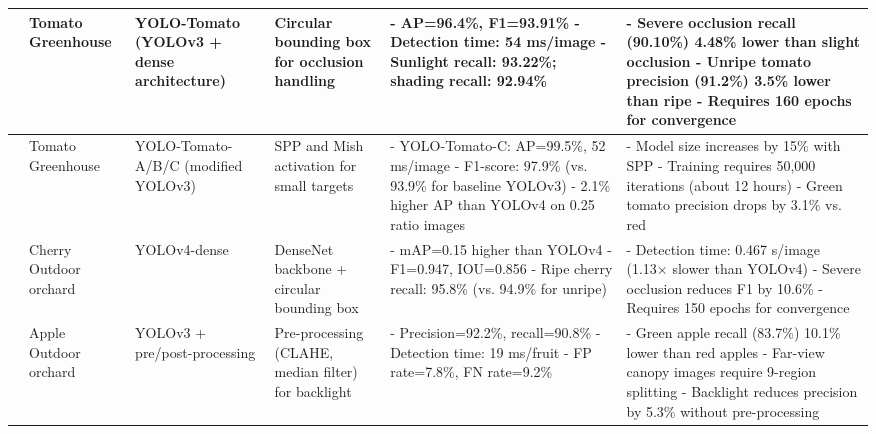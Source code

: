 \documentclass[pdflatex,sn-mathphys-num]{sn-jnl}
\begin{document}
\begin{table}[htbp]
\begin{tabular}{p{1cm}p{1.2cm}p{1cm}p{2cm}p{2.5cm}p{2.8cm}}
	\cite{liu2020yolo} \newline 2020 & Tomato \newline Greenhouse & YOLO-Tomato (YOLOv3 + dense architecture) & Circular bounding box for occlusion handling & - AP=96.4\%, F1=93.91\% \newline - Detection time: 54 ms/image \newline - Sunlight recall: 93.22\%; shading recall: 92.94\% & - Severe occlusion recall (90.10\%) 4.48\% lower than slight occlusion \newline - Unripe tomato precision (91.2\%) 3.5\% lower than ripe \newline - Requires 160 epochs for convergence \\ \midrule
	\cite{lawal2021tomato} \newline 2021 & Tomato \newline Greenhouse & YOLO-Tomato-A/B/C (modified YOLOv3) & SPP and Mish activation for small targets & - YOLO-Tomato-C: AP=99.5\%, 52 ms/image \newline - F1-score: 97.9\% (vs. 93.9\% for baseline YOLOv3) \newline - 2.1\% higher AP than YOLOv4 on 0.25 ratio images & - Model size increases by 15\% with SPP \newline - Training requires 50,000 iterations (about 12 hours) \newline - Green tomato precision drops by 3.1\% vs. red \\ \midrule
	\cite{gai2023detection} \newline 2023 & Cherry \newline Outdoor orchard & YOLOv4-dense & DenseNet backbone + circular bounding box & - mAP=0.15 higher than YOLOv4 \newline - F1=0.947, IOU=0.856 \newline - Ripe cherry recall: 95.8\% (vs. 94.9\% for unripe) & - Detection time: 0.467 s/image (1.13× slower than YOLOv4) \newline - Severe occlusion reduces F1 by 10.6\% \newline - Requires 150 epochs for convergence \\ \midrule
	\cite{kuznetsova2020using} \newline 2020 & Apple \newline Outdoor orchard & YOLOv3 + pre/post-processing & Pre-processing (CLAHE, median filter) for backlight & - Precision=92.2\%, recall=90.8\% \newline - Detection time: 19 ms/fruit \newline - FP rate=7.8\%, FN rate=9.2\% & - Green apple recall (83.7\%) 10.1\% lower than red apples \newline - Far-view canopy images require 9-region splitting \newline - Backlight reduces precision by 5.3\% without pre-processing \\ \midrule

\end{tabular}
\end{table}
\end{document}

